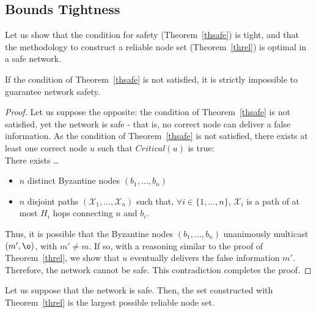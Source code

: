 \documentclass[a4paper,11pt]{article}
\begin{document}
\subsection{Bounds Tightness}
\label{tight}

Let us show that the condition for safety (Theorem~\ref{thsafe}) is tight, and that the methodology to construct a reliable node set (Theorem~\ref{threl}) is optimal in a safe network.

\begin{theorem}
If the condition of Theorem~\ref{thsafe} is not satisfied, it is strictly impossible to guarantee network safety.
\end{theorem}

\begin{proof}
Let us suppose the opposite: the condition of Theorem~\ref{thsafe} is not satisfied, yet the network is safe - that is, no correct node can deliver a false information.
As the condition of Theorem~\ref{thsafe} is not satisfied, there exists at least one correct node $u$ such that $Critical(u)$ is true:
\\There exists \dots
\begin{itemize}
\item $n$ distinct Byzantine nodes $(b_1,\dots,b_n)$
\item $n$ disjoint paths $(\mathcal{X}_1,\dots,\mathcal{X}_n)$ such that, $\forall i \in \{1,\dots,n\}$, $\mathcal{X}_i$ is a path of at most $H_i$ hops connecting $u$ and $b_i$.
\end{itemize}

Thus, it is possible that the Byzantine nodes $(b_1,\dots,b_n)$ unanimously multicast $(m',\o)$, with $m' \neq m$. If so, with a reasoning similar to the proof of Theorem~\ref{threl}, we show that $u$ eventually delivers the false information $m'$. Therefore, the network cannot be safe. This contradiction completes the proof.

\end{proof}

\begin{theorem}
Let us suppose that the network is safe. Then, the set constructed with Theorem~\ref{threl} is the largest possible reliable node set.
\end{theorem}
\end{document}

